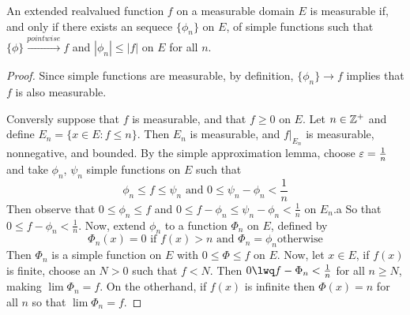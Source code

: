\begin{theorem}\label{3.2.3}
    An extended realvalued function $f$ on a measurable domain  $E$ is
    measurable if, and only if there exists an sequece  $\{\phi_n\}$ on $E$, of
    simple functions such that  $\{\phi\} \xrightarrow{pointwise} f$ and
    $|\phi_n| \leq |f|$ on  $E$ for all  $n$.
\end{theorem}
\begin{proof}
    Since simple functions are measurable, by definition, $\{\phi_n\}
    \xrightarrow{} f$ implies that $f$ is also measurable.

    Conversly suppose that  $f$ is measurable, and that  $f \geq 0$ on  $E$. Let
     $n \in \mathbb{Z}^+$ and define  $E_n=\{x \in E : f \leq n\}$. Then $E_n$ is
     measurable, and  $f|_{E_n}$ is measurable, nonnegative, and bounded. By the
     simple approximation lemma, choose $\varepsilon=\frac{1}{n}$ and take $\phi_n$,
     $\psi_n$ simple functions on  $E$ such that
     \begin{equation*}
         \phi_n \leq f \leq \psi_n \text{ and } 0 \leq \psi_n-\phi_n<\frac{1}{n}
     \end{equation*}
     Then observe that $0 \leq \phi_n \leq f$ and  $0 \leq f-\phi_n \leq
     \psi_n-\phi_n<\frac{1}{n}$ on $E_n$.a So that  $0 \leq
     f-\phi_n<\frac{1}{n}$. Now, extend $\phi_n$ to a function  $\Phi_n$ on
     $E$, defined by
     \begin{equation*}
         \Phi_n(x)=0 \text{ if } f(x)>n \text{ and } \Phi_n=\phi_n \text{
         otherwise}
     \end{equation*}
     Then $\Phi_n$ is a simple function on  $E$ with  $0 \leq \Phi \leq f$ on
     $E$. Now, let  $x \in E$, if  $f(x)$ is finite, choose an  $N>0$ such that
     $f<N$. Then  $0 \lwq f-\Phi_n<\frac{1}{n}$ for all $n \geq N$, making
     $\lim{\Phi_n}=f$. On the otherhand, if $f(x)$ is infinite then $\Phi(x)=n$
     for all $n$ so that  $\lim{\Phi_n}=f$.
\end{proof}
